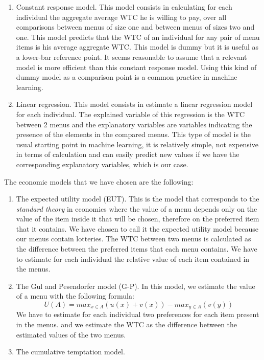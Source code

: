 \documentclass[
]{book}
\begin{document}
\begin{enumerate}
\def\labelenumi{\arabic{enumi}.}
\item
  Constant response model.
  This model consists in calculating for each individual the aggregate average WTC he is
  willing to pay, over all comparisons between menus of size one and between menus
  of sizes two and one.
  This model predicts that the WTC of an individual for any pair of menu items is
  his average aggregate WTC.
  This model is dummy but it is useful as a lower-bar reference point. It seems reasonable to assume that a relevant model is more efficient than this constant response model.
  Using this kind of dummy model as a comparison point is a common practice in
  machine learning.
\item
  Linear regression.
  This model consists in estimate a linear regression model for each individual.
  The explained variable of this regression is the WTC between 2 menus and the
  explanatory variables are variables indicating the presence of the elements in
  the compared menus.
  This type of model is the usual starting point in machine learning, it is
  relatively simple, not expensive in terms of calculation and can easily predict
  new values if we have the corresponding explanatory variables, which is our
  case.
\end{enumerate}

The economic models that we have chosen are the following:

\begin{enumerate}
\def\labelenumi{\arabic{enumi}.}
\item
  The expected utility model (EUT).
  This is the model that corresponds to the \emph{standard theory} in economics where
  the value of a menu depends only on the value of the item inside it that will be
  chosen, therefore on the preferred item that it contains.
  We have chosen to call it the expected utility model because our menus contain
  lotteries.
  The WTC between two menus is calculated as the difference between the preferred
  items that each menu contains.
  We have to estimate for each individual the relative value of each item
  contained in the menus.
\item
  The Gul and Pesendorfer model (G-P).
  In this model, we estimate the value of a menu with the following formula:
  \[ U(A) = max_{x \in A}(u(x) + v(x)) - max_{y \in A}(v(y)) \]
  We have to estimate for each individual two preferences for each item present in
  the menus.
  and we estimate the WTC as the difference between the estimated values of the two
  menus.
\item
  The cumulative temptation model.
\end{enumerate}
\end{document}
